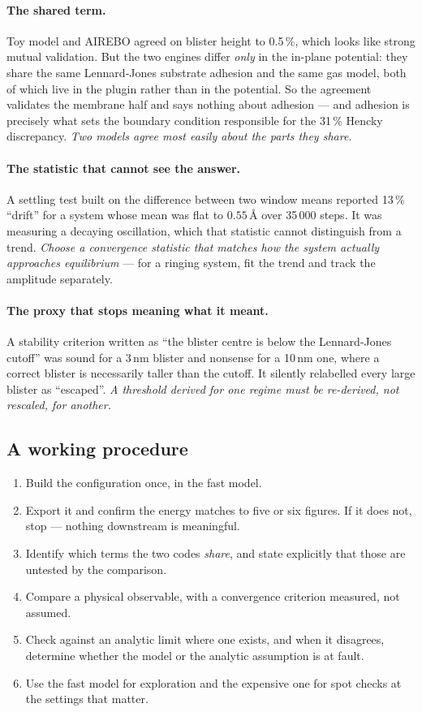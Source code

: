 \documentclass[11pt,a4paper]{article}
\begin{document}
\paragraph{The shared term.} Toy model and AIREBO agreed on blister height to
0.5\,\%, which looks like strong mutual validation. But the two engines differ
\emph{only} in the in-plane potential: they share the same Lennard-Jones
substrate adhesion and the same gas model, both of which live in the plugin
rather than in the potential. So the agreement validates the membrane half and
says nothing about adhesion --- and adhesion is precisely what sets the boundary
condition responsible for the 31\,\% Hencky discrepancy. \emph{Two models agree
most easily about the parts they share.}

\paragraph{The statistic that cannot see the answer.} A settling test built on
the difference between two window means reported 13\,\% ``drift'' for a system
whose mean was flat to $0.55$\,\AA{} over 35\,000 steps. It was measuring a
decaying oscillation, which that statistic cannot distinguish from a trend.
\emph{Choose a convergence statistic that matches how the system actually
approaches equilibrium} --- for a ringing system, fit the trend and track the
amplitude separately.

\paragraph{The proxy that stops meaning what it meant.} A stability criterion
written as ``the blister centre is below the Lennard-Jones cutoff'' was sound
for a 3\,nm blister and nonsense for a 10\,nm one, where a correct blister is
necessarily taller than the cutoff. It silently relabelled every large blister
as ``escaped''. \emph{A threshold derived for one regime must be re-derived, not
rescaled, for another.}

\subsection{A working procedure}

\begin{enumerate}
\item Build the configuration once, in the fast model.
\item Export it and confirm the energy matches to five or six figures. If it
      does not, stop --- nothing downstream is meaningful.
\item Identify which terms the two codes \emph{share}, and state explicitly that
      those are untested by the comparison.
\item Compare a physical observable, with a convergence criterion measured, not
      assumed.
\item Check against an analytic limit where one exists, and when it disagrees,
      determine whether the model or the analytic assumption is at fault.
\item Use the fast model for exploration and the expensive one for spot checks
      at the settings that matter.
\end{enumerate}
\end{document}
